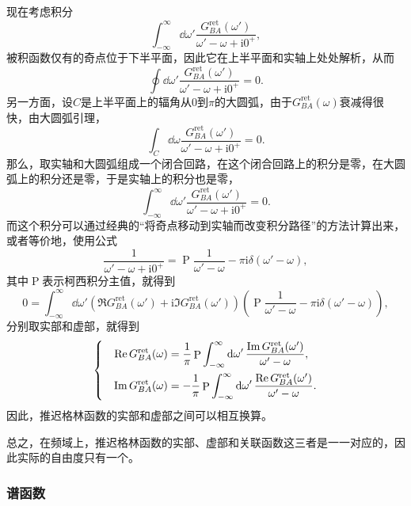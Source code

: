\documentclass[hyperref, UTF8, a4paper]{ctexart}
\DeclareMathOperator{\primevalue}{P}
\newcommand*{\ii}{\mathrm{i}}
\newenvironment{bigcase}{\left\{\quad\begin{aligned}}{\end{aligned}\right.}
\begin{document}
现在考虑积分
\[
    \int_{-\infty}^\infty \dd{\omega'} \frac{G_{BA}^\text{ret}(\omega')}{\omega' - \omega + \ii 0^+},
\]
被积函数仅有的奇点位于下半平面，因此它在上半平面和实轴上处处解析，从而
\[
    \oint \dd{\omega'} \frac{G_{BA}^\text{ret}(\omega')}{\omega' - \omega + \ii 0^+} = 0.
\]
另一方面，设$C$是上半平面上的辐角从$0$到$\pi$的大圆弧，由于$G_{BA}^\text{ret}(\omega)$衰减得很快，由大圆弧引理，
\[
    \int_C \dd{\omega} \frac{G_{BA}^\text{ret}(\omega')}{\omega' - \omega + \ii 0^+} = 0.
\]
那么，取实轴和大圆弧组成一个闭合回路，在这个闭合回路上的积分是零，在大圆弧上的积分还是零，于是实轴上的积分也是零，
\[
    \int_{-\infty}^\infty \dd{\omega'} \frac{G_{BA}^\text{ret}(\omega')}{\omega' - \omega + \ii 0^+} = 0.
\]
而这个积分可以通过经典的“将奇点移动到实轴而改变积分路径”的方法计算出来，或者等价地，使用公式
\[
    \frac{1}{\omega'-\omega+\ii 0^+} = \primevalue \frac{1}{\omega'-\omega} - \pi \ii \delta(\omega'-\omega),
\]
其中$\primevalue$表示柯西积分主值，就得到
\[
    0 = \int_{-\infty}^\infty \dd{\omega'} \left( \Re G_{BA}^\text{ret}(\omega') + \ii \Im G_{BA}^\text{ret}(\omega') \right) \left( \primevalue \frac{1}{\omega'-\omega} - \pi \ii \delta(\omega'-\omega) \right),
\]
分别取实部和虚部，就得到
\begin{equation}
    \begin{bigcase}
        \Re G_{BA}^\text{ret}(\omega) &= \frac{1}{\pi} \primevalue \int_{-\infty}^\infty \dd{\omega'} \frac{\Im G_{BA}^\text{ret}(\omega')}{\omega' - \omega}, \\
        \Im G_{BA}^\text{ret}(\omega) &= - \frac{1}{\pi} \primevalue \int_{-\infty}^\infty \dd{\omega'} \frac{\Re G_{BA}^\text{ret}(\omega')}{\omega' - \omega}.
    \end{bigcase}
\end{equation}
因此，推迟格林函数的实部和虚部之间可以相互换算。

总之，在频域上，推迟格林函数的实部、虚部和关联函数这三者是一一对应的，因此实际的自由度只有一个。

\subsubsection{谱函数}\label{sec:spectral-function}

\end{document}
